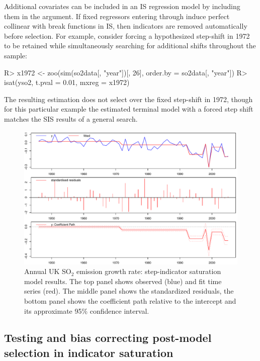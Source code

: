 \documentclass[article,nojss]{jss}
\begin{document}
Additional covariates can be included in an IS regression model by
including them in the  argument. If fixed regressors
entering through  induce perfect collinear with break
functions in IS, then indicators are removed automatically before
selection. For example, consider forcing a hypothesized step-shift in
1972 to be retained while simultaneously searching for additional
shifts throughout the sample:
%
\begin{CodeChunk}
\begin{CodeInput}
R> x1972 <- zoo(sim(so2data[, "year"])[, 26], order.by = so2data[, "year"])
R> isat(yso2, t.pval = 0.01, mxreg = x1972)
\end{CodeInput}
\end{CodeChunk}
%
The resulting estimation does not select over the fixed step-shift in 1972, though for this particular example the estimated terminal model with a forced step shift matches the SIS results of a general search.
%
\begin{figure}[t!]
  \centering
  \includegraphics[scale=0.4]{fig_sis_so2_2.pdf}
  \caption{Annual UK SO$_2$ emission growth rate: step-indicator
    saturation model results. The top panel shows observed (blue) and fit
    time series (red). The middle panel shows the standardized residuals, the bottom panel
    shows the coefficient path relative to the intercept and its
    approximate 95\% confidence interval. \label{fig_sisso2} }
\end{figure}

\subsection{Testing and bias correcting post-model selection in indicator saturation}
\end{document}

